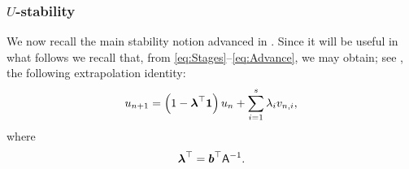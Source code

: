 \documentclass{amsart}
\newcommand{\bflambda}{\mbox{\boldmath$\lambda$}}
\newcommand{\msfA}{\mathsf{A}}
\newcommand{\bfone }{\mathbf{1}}
\newcommand{\bfb}{\boldsymbol{b}}
\theoremstyle{definition}
\begin{document}
\subsubsection{$U$-stability}

We now recall the main stability notion advanced in \cite{MR4673496}. Since it will be useful in what follows we recall that, from \eqref{eq:Stages}--\eqref{eq:Advance}, we may obtain; see \cite[Proposition 3.2]{MR4673496}, the following extrapolation identity:
\begin{equation}
\label{eq:Extrapolation}
  u_{n+1} = \left( 1- \bflambda^\top \bfone \right) u_n + \sum_{i=1}^s \lambda_i v_{n,i},
\end{equation}
where 
\begin{equation}
\label{eq:DefOfLambda}
  \bflambda^\top = \bfb^\top \msfA^{-1}.
\end{equation}
\end{document}
